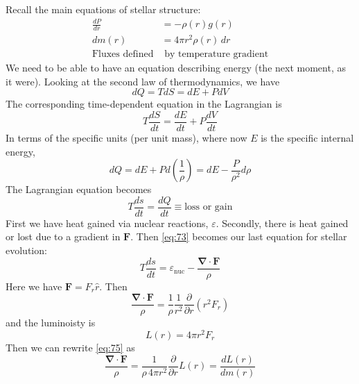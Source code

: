 \documentclass[10pt]{article}
\numberwithin{equation}{section}
\begin{document}
  Recall the main equations of stellar structure:
  \begin{align}
    \label{eq:69}
    \frac{dP}{dr}&=-\rho(r)g(r)\\
    dm(r)&=4\pi r^2\rho(r)\,dr\\
    \nonumber\textrm{Fluxes defined}&\textrm{ by temperature gradient}
  \end{align}
  We need to be able to have an equation describing energy (the next
  moment, as it were). Looking at the second law of thermodynamics, we
  have
  \begin{equation}
    \label{eq:70}
    dQ=TdS=dE+PdV
  \end{equation}
  The corresponding time-dependent equation in the Lagrangian is
  \begin{equation}
    \label{eq:71}
    T\frac{dS}{dt}=\frac{dE}{dt}+P\frac{dV}{dt}
  \end{equation}
  In terms of the specific units (per unit mass), where now $E$ is the
  specific internal energy,
  \begin{equation}
    \label{eq:72}
    dQ=dE+Pd\left(\frac{1}{\rho}\right)=dE-\frac{P}{\rho^2}d\rho
  \end{equation}
  The Lagrangian equation becomes
  \begin{equation}
    \label{eq:73}
    T\frac{ds}{dt}=\frac{dQ}{dt}\equiv\textrm{loss or gain}
  \end{equation}
  First we have heat gained via nuclear reactions,
  $\varepsilon$. Secondly, there is heat gained or lost due to a
  gradient in $\mathbf{F}$. Then \eqref{eq:73} becomes our last equation
  for stellar evolution:
  \begin{equation}
    \label{eq:74}
    \boxed{T\frac{ds}{dt}=\varepsilon_{\mathrm{nuc}}-\frac{\bm{\nabla}\cdot
\mathbf{F}}{\rho}}
  \end{equation}
  Here we have $\mathbf{F}=F_r\hat{r}$. Then
  \begin{equation}
    \label{eq:75}
    \frac{\bm{\nabla}\cdot\mathbf{F}}{\rho}=\frac{1}{\rho}\frac{1}
{r^2}\frac{\partial}{\partial
      r}\left(r^2F_r\right)
  \end{equation}
  and the luminoisty is
  \begin{equation}
    \label{eq:76}
    L(r)=4\pi r^2F_r
  \end{equation}
  Then we can rewrite \eqref{eq:75} as
  \begin{equation}
    \label{eq:77}
    \frac{\bm{\nabla}\cdot\mathbf{F}}{\rho}=\frac{1}{\rho\,4\pi
      r^2}\frac{\partial}{\partial r}L(r)=\frac{d L(r)}{dm(r)}
  \end{equation}
\end{document}
